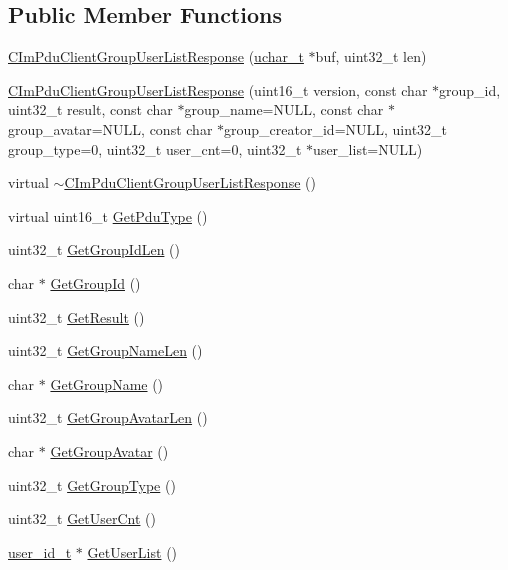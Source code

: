 \subsection*{Public Member Functions}
\begin{DoxyCompactItemize}
\item 
\hyperlink{class_c_im_pdu_client_group_user_list_response_a44f51e690ae008e12a2a867fcce1fa8d}{C\+Im\+Pdu\+Client\+Group\+User\+List\+Response} (\hyperlink{base_2ostype_8h_a124ea0f8f4a23a0a286b5582137f0b8d}{uchar\+\_\+t} $\ast$buf, uint32\+\_\+t len)
\item 
\hyperlink{class_c_im_pdu_client_group_user_list_response_ae383658375d4af4d1576e37a1e223c81}{C\+Im\+Pdu\+Client\+Group\+User\+List\+Response} (uint16\+\_\+t version, const char $\ast$group\+\_\+id, uint32\+\_\+t result, const char $\ast$group\+\_\+name=N\+U\+L\+L, const char $\ast$group\+\_\+avatar=N\+U\+L\+L, const char $\ast$group\+\_\+creator\+\_\+id=N\+U\+L\+L, uint32\+\_\+t group\+\_\+type=0, uint32\+\_\+t user\+\_\+cnt=0, uint32\+\_\+t $\ast$user\+\_\+list=N\+U\+L\+L)
\item 
virtual \hyperlink{class_c_im_pdu_client_group_user_list_response_aed60c7a15e39159a4759aa699aba3c9f}{$\sim$\+C\+Im\+Pdu\+Client\+Group\+User\+List\+Response} ()
\item 
virtual uint16\+\_\+t \hyperlink{class_c_im_pdu_client_group_user_list_response_a74be56ff6c11d52e9444510d230ff7a8}{Get\+Pdu\+Type} ()
\item 
uint32\+\_\+t \hyperlink{class_c_im_pdu_client_group_user_list_response_abc3ca7d8bdc65a4829db715deb5d25f0}{Get\+Group\+Id\+Len} ()
\item 
char $\ast$ \hyperlink{class_c_im_pdu_client_group_user_list_response_a4993dbfef1096c50fefd9b83e75b985a}{Get\+Group\+Id} ()
\item 
uint32\+\_\+t \hyperlink{class_c_im_pdu_client_group_user_list_response_ab739c2b2ff1d0555bee2e0dcb4f4287c}{Get\+Result} ()
\item 
uint32\+\_\+t \hyperlink{class_c_im_pdu_client_group_user_list_response_adc700720fafa1eeda04876cad0ecc090}{Get\+Group\+Name\+Len} ()
\item 
char $\ast$ \hyperlink{class_c_im_pdu_client_group_user_list_response_ab77cafc67d55dd53b977b33d70ef6931}{Get\+Group\+Name} ()
\item 
uint32\+\_\+t \hyperlink{class_c_im_pdu_client_group_user_list_response_ae4f3b4da3a2baf8f45288a92c7b6309b}{Get\+Group\+Avatar\+Len} ()
\item 
char $\ast$ \hyperlink{class_c_im_pdu_client_group_user_list_response_af4659ea7efab16b7213226d95615021b}{Get\+Group\+Avatar} ()
\item 
uint32\+\_\+t \hyperlink{class_c_im_pdu_client_group_user_list_response_a2c95297b939c3063526d47059854f9eb}{Get\+Group\+Type} ()
\item 
uint32\+\_\+t \hyperlink{class_c_im_pdu_client_group_user_list_response_af3ec079399d675ff8320e31b547bb5c4}{Get\+User\+Cnt} ()
\item 
\hyperlink{structuser__id__t}{user\+\_\+id\+\_\+t} $\ast$ \hyperlink{class_c_im_pdu_client_group_user_list_response_acbff6495825486b55a2e298627ff7e4d}{Get\+User\+List} ()
\end{DoxyCompactItemize}
